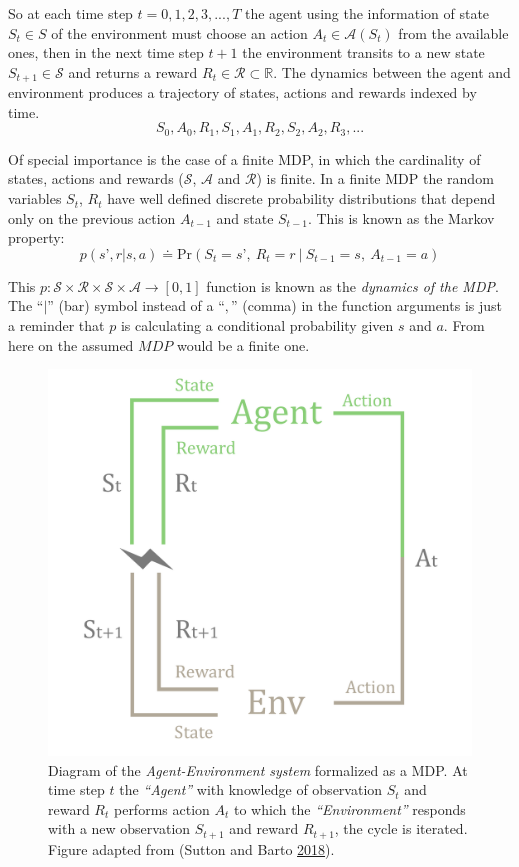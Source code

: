 \documentclass[
  12pt,
  openany]{book}
\begin{document}
So at each time step \(t=0,1,2,3,...,T\) the agent using the information of state \(S_t \in S\) of the environment must choose an action \(A_t \in \mathcal{A}(S_t)\) from the available ones, then in the next time step \(t+1\) the environment transits to a new state \(S_{t+1} \in \mathcal{S}\) and returns a reward \(R_t \in \mathcal{R} \subset \mathds{R}\). The dynamics between the agent and environment produces a trajectory of states, actions and rewards indexed by time.
\[ S_0, A_0, R_1, S_1, A_1, R_2, S_2, A_2, R_3, ...\]

Of special importance is the case of a finite MDP, in which the cardinality of states, actions and rewards (\(\mathcal{S}\), \(\mathcal{A}\) and \(\mathcal{R}\)) is finite. In a finite MDP the random variables \(S_t\), \(R_t\) have well defined discrete probability distributions that depend only on the previous action \(A_{t-1}\) and state \(S_{t-1}\). This is known as the Markov property:
\[ p(s’, r | s, a) \doteq \text{Pr}(S_t=s’,\ R_t=r\ |\ S_{t-1}=s,\ A_{t-1}=a) \]

This \(p: \mathcal{S} \times \mathcal{R} \times \mathcal{S} \times \mathcal{A} \rightarrow [0,1]\) function is known as the \emph{dynamics of the MDP}. The ``\(|\)'' (bar) symbol instead of a ``\(,\)'' (comma) in the function arguments is just a reminder that \(p\) is calculating a conditional probability given \(s\) and \(a\). From here on the assumed \(MDP\) would be a finite one.



\begin{figure}

{\centering \includegraphics[width=0.8\linewidth]{pics/agent-env} 

}

\caption{Diagram of the \emph{Agent-Environment system} formalized as a MDP. At time step \(t\) the \emph{``Agent''} with knowledge of observation \(S_t\) and reward \(R_t\) performs action \(A_t\) to which the \emph{``Environment''} responds with a new observation \(S_{t+1}\) and reward \(R_{t+1}\), the cycle is iterated. Figure adapted from (Sutton and Barto \protect\hyperlink{ref-sutton2018reinforcement}{2018}).}\label{fig:env-agent-interactions}
\end{figure}
\end{document}
